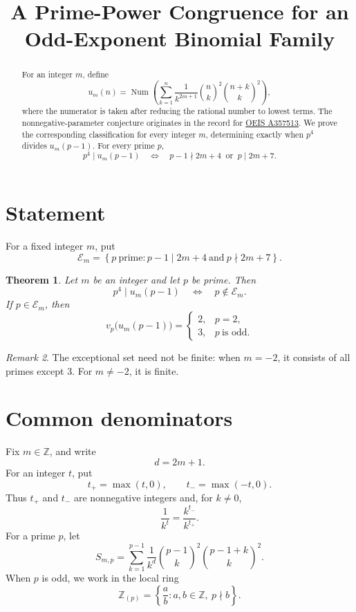 \documentclass[11pt,reqno]{amsart}
\title{A Prime-Power Congruence for an Odd-Exponent Binomial Family}
\author{}
\date{}
\newtheorem{theorem}{Theorem}
\theoremstyle{remark}
\newtheorem{remark}[theorem]{Remark}
\newcommand{\Z}{\mathbb Z}
\newcommand{\Zloc}{\mathbb Z_{(p)}}
\DeclareMathOperator{\Num}{Num}
\begin{document}
\begin{abstract}
For an integer $m$, define
$$
 u_m(n)=\Num\left(
 \sum_{k=1}^{n}\frac{1}{k^{2m+1}}
 \binom{n}{k}^{2}\binom{n+k}{k}^{2}
 \right),
$$
where the numerator is taken after reducing the rational number to
lowest terms.  The nonnegative-parameter conjecture originates in the
record for \href{https://oeis.org/A357513}{OEIS A357513}.  We prove the
corresponding classification for every integer $m$, determining exactly
when $p^4$ divides $u_m(p-1)$.
For every prime $p$,
$$
 p^4\mid u_m(p-1)
 \quad\Longleftrightarrow\quad
 p-1\nmid 2m+4\ \text{ or }\ p\mid 2m+7.
$$
\end{abstract}

\maketitle

\section{Statement}


For a fixed integer $m$, put
$$
 \mathcal E_m=
 \left\{p\ \text{prime}:
 p-1\mid 2m+4\ \text{and}\ p\nmid 2m+7\right\}.
$$

\begin{theorem}\label{thm:main}
Let $m$ be an integer and let $p$ be prime.  Then
$$
 p^4\mid u_m(p-1)
 \quad\Longleftrightarrow\quad
 p\notin\mathcal E_m.
$$
If $p\in\mathcal E_m$, then
$$
 v_p\bigl(u_m(p-1)\bigr)=
 \begin{cases}
  2,&p=2,\\
  3,&p\ \text{is odd}.
 \end{cases}
$$
\end{theorem}

\begin{remark}
The exceptional set need not be finite: when $m=-2$, it consists of
all primes except $3$.  For $m\neq-2$, it is finite.
\end{remark}

\section{Common denominators}

Fix $m\in\Z$, and write
$$
 d=2m+1.
$$
For an integer $t$, put
$$
 t_+=\max(t,0),\qquad t_-=\max(-t,0).
$$
Thus $t_+$ and $t_-$ are nonnegative integers and, for $k\neq0$,
$$
 \frac{1}{k^t}=\frac{k^{t_-}}{k^{t_+}}.
$$
For a prime $p$, let
$$
 S_{m,p}=\sum_{k=1}^{p-1}\frac{1}{k^d}
 \binom{p-1}{k}^{2}\binom{p-1+k}{k}^{2}.
$$
When $p$ is odd, we work in the local ring
$$
 \Zloc=\left\{\frac{a}{b}:a,b\in\Z,\ p\nmid b\right\}.
$$
\end{document}
